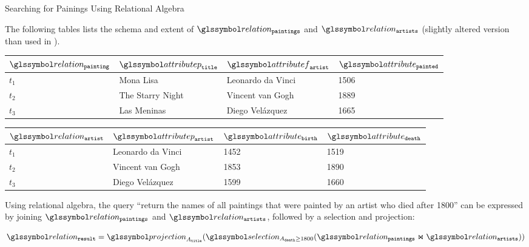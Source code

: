 \begin{example}[label=example:rel_alg_query]{Searching for Painings Using Relational Algebra}{}

    The following tables lists the schema and extent of $\relation_{\mathtt{paintings}}$ and $\relation_{\mathtt{artists}}$ (slightly altered version than used in ).

    \begin{center}
        \begin{tabular}{ l || l | l | l |}
            $\relation_{\mathtt{painting}}$ & $\attributep_{\mathtt{title}}$  & $\attributef_{\mathtt{artist}}$  & $\attribute_{\mathtt{painted}}$ \\ 
            \hline
            \hline
            $t_1$ & Mona Lisa &  Leonardo da Vinci & 1506 \\
            \hline
            $t_2$ & The Starry Night & Vincent van Gogh & 1889 \\
            \hline
            $t_3$ & Las Meninas & Diego Velázquez & 1665 \\
            \hline
        \end{tabular}
    \end{center}

    \begin{center}
        \begin{tabular}{ l || l | l | l |}
            $\relation_{\mathtt{artist}}$ & $\attributep_{\mathtt{artist}}$ & $\attribute_{\mathtt{birth}}$ & $\attribute_{\mathtt{death}}$\\ 
            \hline
            \hline
            $t_1$ & Leonardo da Vinci & 1452 & 1519 \\
            \hline
            $t_2$ & Vincent van Gogh & 1853 & 1890 \\
            \hline
            $t_3$ & Diego Velázquez & 1599 & 1660 \\
            \hline
        \end{tabular}
    \end{center}

    Using relational algebra, the query ``return the names of all paintings that were painted by an artist who died after 1800'' can be expressed by joining $\relation_{\mathtt{paintings}}$ and $\relation_{\mathtt{artists}}$, followed by a selection and projection:

    \begin{equation*}
        \relation_{\mathtt{result}} = \projection_{A_{\mathtt{title}}} (\selection_{A_{\mathtt{death}} \geq 1800}(\relation_{\mathtt{paintings}} \Join \relation_{\mathtt{artists}}))
    \end{equation*}


\end{example}
